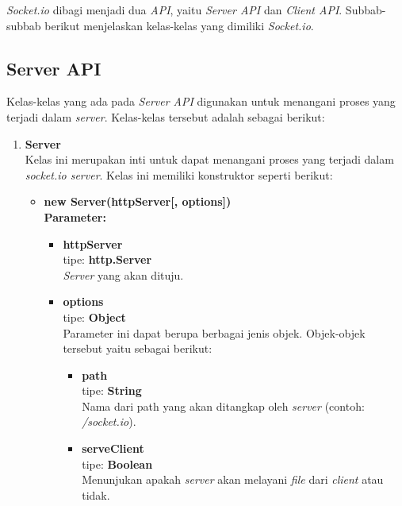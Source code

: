 \textit{Socket.io} dibagi menjadi dua \textit{API}, yaitu \textit{Server API} dan \textit{Client API}. Subbab-subbab berikut menjelaskan kelas-kelas yang dimiliki \textit{Socket.io}.

\subsection{Server API}
Kelas-kelas yang ada pada \textit{Server API} digunakan untuk menangani proses yang terjadi dalam \textit{server}\cite{rauch:11:socketioserver}. Kelas-kelas tersebut adalah sebagai berikut:

\begin{enumerate}
	\item \textbf{Server} \\ 
	Kelas ini merupakan inti untuk dapat menangani proses yang terjadi dalam \textit{socket.io server}. Kelas ini memiliki konstruktor seperti berikut: 
	\begin{itemize}
		\item \textbf{new Server(httpServer[, options])} \\ 
		\textbf{Parameter:}
		\begin{itemize}
			\item \textbf{httpServer} \\ tipe: \textbf{http.Server} \\ \textit{Server} yang akan dituju.
			\item \textbf{options} \\ tipe: \textbf{Object} \\ Parameter ini dapat berupa berbagai jenis objek. Objek-objek tersebut yaitu sebagai berikut: 
			\begin{itemize}
				\item \textbf{path} \\ tipe: \textbf{String} \\ Nama dari path yang akan ditangkap oleh \textit{server} (contoh: \textit{/socket.io}).
				
				\item \textbf{serveClient} \\ tipe: \textbf{Boolean} \\ Menunjukan apakah \textit{server} akan melayani \textit{file} dari \textit{client} atau tidak.
				
%				
				

\end{itemize}
\end{itemize}
\end{itemize}
\end{enumerate}
